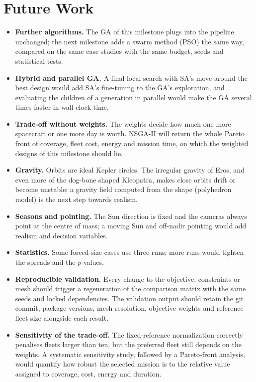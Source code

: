 \chapter{Future Work}
\label{ch:future}

\begin{itemize}
\item \textbf{Further algorithms.} The \ac{GA} of this milestone plugs into the pipeline unchanged;
the next milestone adds a swarm method (\ac{PSO}) the same way, compared on the same case studies with
the same budget, seeds and statistical tests.
\item \textbf{Hybrid and parallel \ac{GA}.} A final local search with \ac{SA}'s move around the best
design would add \ac{SA}'s fine-tuning to the \ac{GA}'s exploration, and evaluating the children of a
generation in parallel would make the \ac{GA} several times faster in wall-clock time.
\item \textbf{Trade-off without weights.} The weights decide how much one more spacecraft or one more
day is worth. \ac{NSGA}-II will return the whole Pareto front of coverage, fleet cost, energy and
mission time, on which the weighted designs of this milestone should lie.
\item \textbf{Gravity.} Orbits are ideal Kepler circles. The irregular gravity of Eros, and even more
of the dog-bone shaped Kleopatra, makes close orbits drift or become unstable; a gravity field
computed from the shape (polyhedron model) is the next step towards realism.
\item \textbf{Seasons and pointing.} The Sun direction is fixed and the cameras always point at the
centre of mass; a moving Sun and off-nadir pointing would add realism and decision variables.
\item \textbf{Statistics.} Some forced-size cases use three runs; more runs would tighten the spreads
and the $p$-values.
\item \textbf{Reproducible validation.} Every change to the objective, constraints or mesh should
trigger a regeneration of the comparison matrix with the same seeds and locked dependencies. The
validation output should retain the git commit, package versions, mesh resolution, objective weights
and reference fleet size alongside each result.
\item \textbf{Sensitivity of the trade-off.} The fixed-reference normalization correctly penalises
fleets larger than ten, but the preferred fleet still depends on the weights. A systematic sensitivity
study, followed by a Pareto-front analysis, would quantify how robust the selected mission is to the
relative value assigned to coverage, cost, energy and duration.
\end{itemize}
